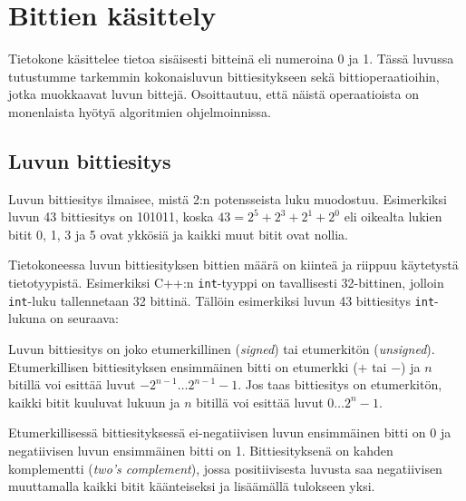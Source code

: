 \chapter{Bittien käsittely}

Tietokone käsittelee tietoa sisäisesti bitteinä
eli numeroina 0 ja 1.
Tässä luvussa tutustumme tarkemmin kokonaisluvun
bittiesitykseen sekä bittioperaatioihin,
jotka muokkaavat luvun bittejä.
Osoittautuu, että näistä operaatioista on
monenlaista hyötyä algoritmien ohjelmoinnissa.
% 

\section{Luvun bittiesitys}

Luvun bittiesitys ilmaisee, mistä 2:n potensseista
luku muodostuu. Esimerkiksi luvun 43 bittiesitys on 101011, koska
$43 = 2^5 + 2^3 + 2^1 + 2^0$
eli oikealta lukien bitit 0, 1, 3 ja 5 ovat ykkösiä
ja kaikki muut bitit ovat nollia.

Tietokoneessa luvun bittiesityksen
bittien määrä on kiinteä ja riippuu käytetystä tietotyypistä.
Esimerkiksi C++:n \texttt{int}-tyyppi on tavallisesti 32-bittinen,
jolloin \texttt{int}-luku tallennetaan 32 bittinä.
Tällöin esimerkiksi luvun 43 bittiesitys \texttt{int}-lukuna on seuraava:
\begin{center}
\end{center}

Luvun bittiesitys on joko etumerkillinen (\textit{signed})
tai etumerkitön (\textit{unsigned}).
Etumerkillisen bittiesityksen ensimmäinen bitti on etumerkki
($+$ tai $-$) ja $n$ bitillä voi esittää luvut $-2^{n-1} \ldots 2^{n-1}-1$.
Jos taas bittiesitys on etumerkitön,
kaikki bitit kuuluvat lukuun ja $n$ bitillä voi esittää luvut $0 \ldots 2^n-1$.

Etumerkillisessä bittiesityksessä ei-negatiivisen luvun
ensimmäinen bitti on 0 ja negatiivisen luvun
ensimmäinen bitti on 1.
Bittiesityksenä on kahden komplementti
(\textit{two's complement}),
jossa positiivisesta luvusta saa negatiivisen muuttamalla
kaikki bitit käänteiseksi ja lisäämällä
tulokseen yksi.

